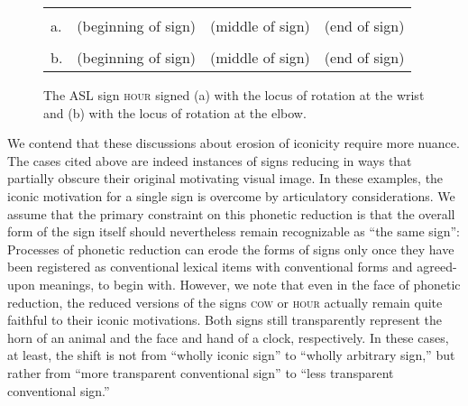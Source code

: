 \documentclass[output=paper,
modfonts
]{LSP/langsci}
\begin{document}
\begin{figure}
\begin{tabularx}{\linewidth}{lCCC}
&  &  &  \\
a. & (beginning of sign) & (middle of sign) & (end of sign) \\
&  &  &  \\
b. & (beginning of sign) & (middle of sign) & (end of sign) \\
\end{tabularx}	
\caption{The ASL sign \textsc{hour} signed (a) with the locus of rotation at the wrist and (b) with the locus of rotation at the elbow.}
\label{fig:2}
\end{figure}


  We contend that these discussions about erosion of iconicity require more nuance. The cases cited above are indeed instances of signs reducing in ways that partially obscure their original motivating visual image. In these examples, the iconic motivation for a single sign is overcome by articulatory considerations. We assume that the primary constraint on this phonetic reduction is that the overall form of the sign itself should nevertheless remain recognizable as ``the same sign'': Processes of phonetic reduction can erode the forms of signs only once they have been registered as conventional lexical items with conventional forms and agreed-upon meanings, to begin with. However, we note that even in the face of phonetic reduction, the reduced versions of the signs \textsc{cow} or \textsc{hour} actually remain quite faithful to their iconic motivations. Both signs still transparently represent the horn of an animal and the face and hand of a clock, respectively. In these cases, at least, the shift is not from ``wholly iconic sign'' to ``wholly arbitrary sign,'' but rather from ``more transparent conventional sign'' to ``less transparent conventional sign.''
\end{document}
